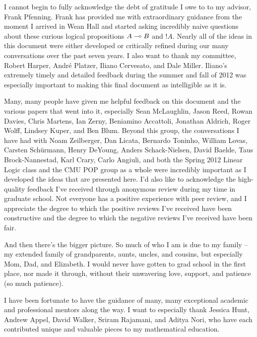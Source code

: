 \documentclass[12pt]{cmuthesis}
\begin{document}
\begin{acknowledgments}
  I cannot begin to fully acknowledge the debt of gratitude I owe to
  to my advisor, Frank Pfenning. Frank has provided me with
  extraordinary guidance from the moment I arrived in Wean Hall and
  started asking incredibly naive questions about these curious
  logical propositions $A \multimap B$ and ${!}A$. Nearly all of the
  ideas in this document were either developed or critically refined
  during our many conversations over the past seven years. I also want
  to thank my committee, Robert Harper, Andr{\'e} Platzer, Iliano
  Cervesato, and Dale Miller. Iliano's extremely timely and detailed
  feedback during the summer and fall of 2012 was especially important
  to making this final document as intelligible as it is.

  Many, many people have given me helpful feedback on this document
  and the various papers that went into it, especially Sean
  McLaughlin, Jason Reed, Rowan Davies, Chris Martens, Ian Zerny,
  Beniamino Accattoli, Jonathan Aldrich, Roger Wolff, Lindsey Kuper,
  and Ben Blum.  Beyond this group, the conversations I have had with
  Noam Zeilberger, Dan Licata, Bernardo Toninho, William Lovas,
  Carsten Sch{\"u}rmann, Henry DeYoung, Anders Schack-Nielsen, David
  Baelde, Taus Brock-Nannestad, Karl Crary, Carlo Angiuli, and both
  the Spring 2012 Linear Logic class and the CMU POP group as a whole
  were incredibly important as I developed the ideas that are
  presented here.  I'd also like to acknowledge the high-quality
  feedback I've received through anonymous review during my time in
  graduate school. Not everyone has a positive experience with peer
  review, and I appreciate the degree to which the positive reviews
  I've received have been constructive and the degree to which the
  negative reviews I've received have been fair.

  And then there's the bigger picture.  So much of who I am is due to
  my family -- my extended family of grandparents, aunts, uncles, and
  cousins, but especially Mom, Dad, and Elizabeth. I would never have
  gotten to grad school in the first place, nor made it through,
  without their unwavering love, support, and patience (so much
  patience).

  I have been fortunate to have the guidance of many, many exceptional
  academic and professional mentors along the way. I want to
  especially thank Jessica Hunt, Andrew Appel, David Walker, Sriram
  Rajamani, and Aditya Nori, who have each contributed unique and
  valuable pieces to my mathematical education.


\end{acknowledgments}
\end{document}
